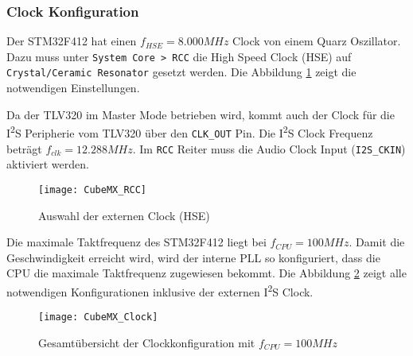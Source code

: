 \subsubsection{Clock Konfiguration}
\label{sec:CubeMXClock}

Der STM32F412 hat einen $f_{HSE}=8.000\si{MHz}$ Clock von einem Quarz Oszillator.
Dazu muss unter \texttt{System Core > RCC} die High Speed Clock (HSE) auf \texttt{Crystal/Ceramic Resonator} gesetzt werden. Die Abbildung \ref{pic:CubeMX_RCC} zeigt die notwendigen Einstellungen.

Da der TLV320 im Master Mode betrieben wird, kommt auch der Clock für die I\textsuperscript{2}S Peripherie vom TLV320 über den \texttt{CLK\_OUT} Pin.
Die I\textsuperscript{2}S Clock Frequenz beträgt $f_{clk}=12.288\si{MHz}$.
Im \texttt{RCC} Reiter muss die Audio Clock Input (\texttt{I2S\_CKIN}) aktiviert werden.

\begin{figure}[H]
	\centering
	\texttt{[image: CubeMX\_RCC]}
	\caption{Auswahl der externen Clock (HSE)}
	\label{pic:CubeMX_RCC}
\end{figure}

Die maximale Taktfrequenz des STM32F412 liegt bei $f_{CPU}=100\si{MHz}$.
Damit die Geschwindigkeit erreicht wird, wird der interne PLL so konfiguriert, dass die CPU die maximale Taktfrequenz zugewiesen bekommt. Die Abbildung \ref{pic:CubeMX_Clock} zeigt alle notwendigen Konfigurationen inklusive der externen I\textsuperscript{2}S Clock.

\begin{figure}[H]
	\centering
	\texttt{[image: CubeMX\_Clock]}
	\caption{Gesamtübersicht der Clockkonfiguration mit $f_{CPU}=100\si{MHz}$}
	\label{pic:CubeMX_Clock}
\end{figure}

